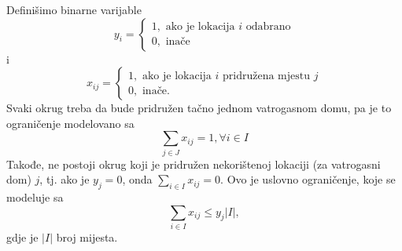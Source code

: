 \documentclass[a4paper, utf8, 11pt, colorlinks]{article}
\begin{document}
Definišimo binarne varijable 
$$y_i = \begin{cases}
              1, \mbox{ ako je lokacija } i \mbox{ odabrano} \\
              0, \mbox{ inače}
        \end{cases}$$
i 
$$
x_{ij}= \begin{cases}
             1, \mbox{ ako je lokacija } i \mbox{ pridružena mjestu } j \\
             0, \mbox{ inače}. 
        \end{cases}
$$
Svaki okrug treba da bude pridružen tačno jednom vatrogasnom domu, pa je to ograničenje modelovano sa
\begin{equation}\label{eq:ex-constr-1}
      \sum_{j \in J} x_{ij} = 1, \forall i \in I
\end{equation}
Takođe, ne postoji okrug koji je pridružen nekorištenoj lokaciji (za vatrogasni dom) $j$, tj. ako je $y_j = 0$, onda $ \sum_{i \in I} x_{ij} = 0$. Ovo je uslovno ograničenje, koje se modeluje sa
\begin{equation}\label{eq:ex-constr-2}
    \sum_{i \in I} x_{ij} \leq y_j |I|,
 \end{equation}
gdje je $|I|$ broj mijesta. 
\end{document}

